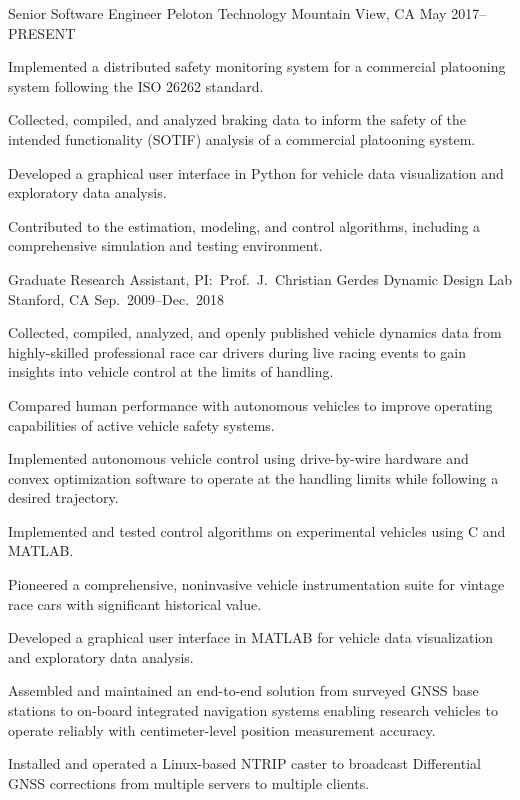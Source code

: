 \begin{cventries}
  \cventry%
    {Senior Software Engineer}
    {Peloton Technology}
    {Mountain View, CA}
    {May 2017--PRESENT}
    {
      \begin{cvitems}
        \item{Implemented a distributed safety monitoring system for a commercial platooning system following the ISO 26262 standard.}
        \item{Collected, compiled, and analyzed braking data to inform the safety of the intended functionality (SOTIF) analysis of a commercial platooning system.}
        \item{Developed a graphical user interface in Python for vehicle data visualization and exploratory data analysis.}
        \item{Contributed to the estimation, modeling, and control algorithms, including a comprehensive simulation and testing environment.}
      \end{cvitems}
    }

  \cventry%
    {Graduate Research Assistant, PI:\ Prof.~J.~Christian Gerdes}
    {Dynamic Design Lab}
    {Stanford, CA}
    {Sep.\ 2009--Dec.\ 2018}
    {
      \begin{cvitems}
        \item{Collected, compiled, analyzed, and openly published vehicle dynamics data from highly-skilled professional race car drivers during live racing events to gain insights into vehicle control at the limits of handling.}
        \item{Compared human performance with autonomous vehicles to improve operating capabilities of active vehicle safety systems.}
        \item{Implemented autonomous vehicle control using drive-by-wire hardware and convex optimization software to operate at the handling limits while following a desired trajectory.}
        \item{Implemented and tested control algorithms on experimental vehicles using C and MATLAB\@.}
        \item{Pioneered a comprehensive, noninvasive vehicle instrumentation suite for vintage race cars with significant historical value.}
        \item{Developed a graphical user interface in MATLAB for vehicle data visualization and exploratory data analysis.}
        \item{Assembled and maintained an end-to-end solution from surveyed GNSS base stations to on-board integrated navigation systems enabling research vehicles to operate reliably with centimeter-level position measurement accuracy.}
        \item{Installed and operated a Linux-based NTRIP caster to broadcast Differential GNSS corrections from multiple servers to multiple clients.}
      \end{cvitems}
    }


\end{cventries}
